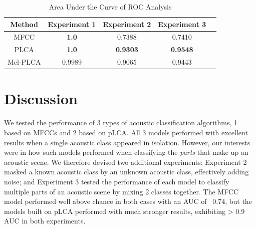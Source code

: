 \documentclass[a4paper,10pt,final]{ThesisStyle}
\begin{document}
\begin{table}
\centering
\caption{Area Under the Curve of ROC Analysis}
\begin{tabular}{|c|c|c|c|l|} \hline
Method&Experiment 1&Experiment 2&Experiment 3\\ \hline
MFCC&\textbf{1.0}&0.7388&0.7410\\ \hline
PLCA&\textbf{1.0}&\textbf{0.9303}&\textbf{0.9548}\\ \hline
Mel-PLCA&0.9989&0.9065&0.9443\\ \hline
\end{tabular}
\end{table}



\section{Discussion}


We tested the performance of 3 types of acoustic classification algorithms, 1 based on MFCCs and 2 based on pLCA.  All 3 models performed with excellent results when a single acoustic class appeared in isolation.  However, our interests were in how such models performed when classifying the \textit{parts} that make up an acoustic scene.  We therefore devised two additional experiments: Experiment 2 masked a known acoustic class by an unknown acoustic class, effectively adding noise; and Experiment 3 tested the performance of each model to classify multiple parts of an acoustic scene by mixing 2 classes together.  The MFCC model performed well above chance in both cases with an AUC of ~0.74, but the models built on pLCA performed with much stronger results, exhibiting > 0.9 AUC in both experiments.  
\end{document}
